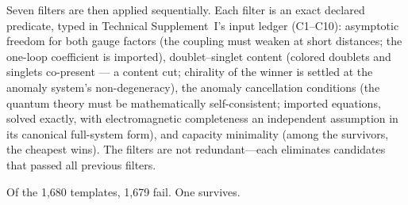 \documentclass[11pt]{article}
\begin{document}
Seven filters are then applied sequentially.  Each filter is an exact declared predicate, typed in Technical Supplement~I's input ledger (C1--C10): asymptotic freedom for both gauge factors (the coupling must weaken at short distances; the one-loop coefficient is imported), doublet--singlet content (colored doublets and singlets co-present --- a content cut; chirality of the winner is settled at the anomaly system's non-degeneracy), the anomaly cancellation conditions (the quantum theory must be mathematically self-consistent; imported equations, solved exactly, with electromagnetic completeness an independent assumption in its canonical full-system form), and capacity minimality (among the survivors, the cheapest wins).  The filters are not redundant---each eliminates candidates that passed all previous filters.

Of the 1{,}680 templates, 1{,}679 fail.  One survives.
\end{document}
